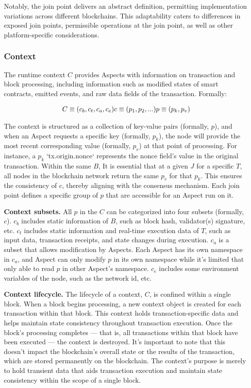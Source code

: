 Notably, the join point delivers an abstract definition, permitting implementation variations across different blockchains. This adaptability caters to differences in exposed join points, permissible operations at the join point, as well as other platform-specific considerations.

\subsubsection{Context}

The runtime context $C$ provides Aspects with information on transaction and block processing, including information such as modified states of smart contracts, emitted events, and raw data fields of the transaction. Formally: 

$$
C \equiv (c_b, c_t, c_a, c_e) \\ 
c \equiv (p_1, p_2,...) \\ p \equiv (p_{k}, p_{v})
$$

The context is structured as a collection of key-value pairs (formally, $p$), and when an Aspect requests a specific key (formally, $p_k$), the node will provide the most recent corresponding value (formally, $p_v$) at that point of processing. For instance, a $p_k$ `tx.origin.nonce` represents the nonce field’s value in the original transaction. Within the same $B$, It is essential that at a given $J$ for a specific $T$, all nodes in the blockchain network return the same $p_v$ for that $p_k$. This ensures the consistency of $c$, thereby aligning with the consensus mechanism. Each join point defines a specific group of $p$ that are accessible for an Aspect run on it.

\textbf{Context subsets.} All $p$ in the $C$ can be categorized into four subsets (formally, $c$). $c_{b}$ includes static information of $B$, such as block hash, validator(s) signature, etc. $c_{t}$ includes static information and real-time execution data of $T$, such as input data, transaction receipts, and state changes during execution. $c_a$ is a subset that allows modification by Aspects. Each Aspect has its own namespace in $c_a$, and Aspect can only modify $p$ in its own namespace while it’s limited that only able to read $p$ in other Aspect’s namespace. $c_e$ includes some environment variables of the node, such as the network id, etc.

\textbf{Context lifecycle.} The lifecycle of a context, $C$, is confined within a single block. When a block begins processing, a new context object is created for each transaction within that block. This context holds transaction-specific data and helps maintain state consistency throughout transaction execution. Once the block's processing completes — that is, all transactions within that block have been executed — the context is destroyed. It's important to note that this doesn't impact the blockchain's overall state or the results of the transaction, which are stored permanently on the blockchain. The context's purpose is merely to hold transient data that aids transaction execution and maintain state consistency within the scope of a single block.

